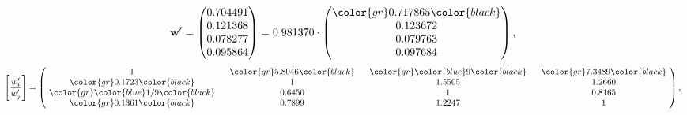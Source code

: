 \begin{example}
\begin{equation*}
\mathbf{w}^{\prime} =
\begin{pmatrix}
0.704491\\
0.121368\\
0.078277\\
0.095864
\end{pmatrix} =
0.981370\cdot
\begin{pmatrix}
\color{gr} 0.717865\color{black} \\
0.123672\\
0.079763\\
0.097684
\end{pmatrix},
\end{equation*}
\begin{equation*}
\left[ \frac{{w}^{\prime}_i}{{w}^{\prime}_j} \right] =
\begin{pmatrix}
$\,\,$ 1 $\,\,$ & $\,\,$\color{gr} 5.8046\color{black} $\,\,$ & $\,\,$\color{gr} \color{blue} 9\color{black} $\,\,$ & $\,\,$\color{gr} 7.3489\color{black} $\,\,$ \\
$\,\,$\color{gr} 0.1723\color{black} $\,\,$ & $\,\,$ 1 $\,\,$ & $\,\,$1.5505$\,\,$ & $\,\,$1.2660  $\,\,$ \\
$\,\,$\color{gr} \color{blue}  1/9\color{black} $\,\,$ & $\,\,$0.6450$\,\,$ & $\,\,$ 1 $\,\,$ & $\,\,$0.8165 $\,\,$ \\
$\,\,$\color{gr} 0.1361\color{black} $\,\,$ & $\,\,$0.7899$\,\,$ & $\,\,$1.2247$\,\,$ & $\,\,$ 1  $\,\,$ \\
\end{pmatrix},
\end{equation*}
\end{example}
\newpage
